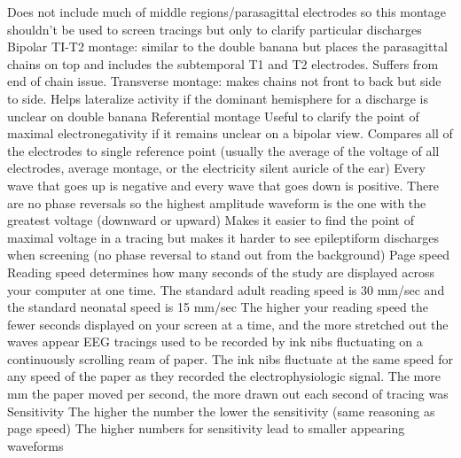 \documentclass[12pt]{article}
\begin{document}
Does not include much of middle regions/parasagittal electrodes so this montage shouldn’t be used to screen tracings but only to clarify particular discharges 
Bipolar TI-T2 montage: similar to the double banana but places the parasagittal chains on top and includes the subtemporal T1 and T2 electrodes. Suffers from end of chain issue.
Transverse montage: makes chains not front to back but side to side. Helps lateralize activity if the dominant hemisphere for a discharge is unclear on double banana
Referential montage 
Useful to clarify the point of maximal electronegativity if it remains unclear on a bipolar view.
Compares all of the electrodes to single reference point (usually the average of the voltage of all electrodes, average montage, or the electricity silent auricle of the ear)
Every wave that goes up is negative and every wave that goes down is positive. 
There are no phase reversals so the highest amplitude waveform is the one with the greatest voltage (downward or upward)
Makes it easier to find the point of maximal voltage in a tracing but makes it harder to see epileptiform discharges when screening (no phase reversal to stand out from the background)
Page speed
Reading speed determines how many seconds of the study are displayed across your computer at one time. 
The standard adult reading speed is 30 mm/sec and the standard neonatal speed is 15 mm/sec
The higher your reading speed the fewer seconds displayed on your screen at a time, and the more stretched out the waves appear
EEG tracings used to be recorded by ink nibs fluctuating on a continuously scrolling ream of paper. 
The ink nibs fluctuate at the same speed for any speed of the paper as they recorded the electrophysiologic signal.
The more mm the paper moved per second, the more drawn out each second of tracing was
Sensitivity 
The higher the number the lower the sensitivity (same reasoning as page speed)
The higher numbers for sensitivity lead to smaller appearing waveforms
\end{document}
